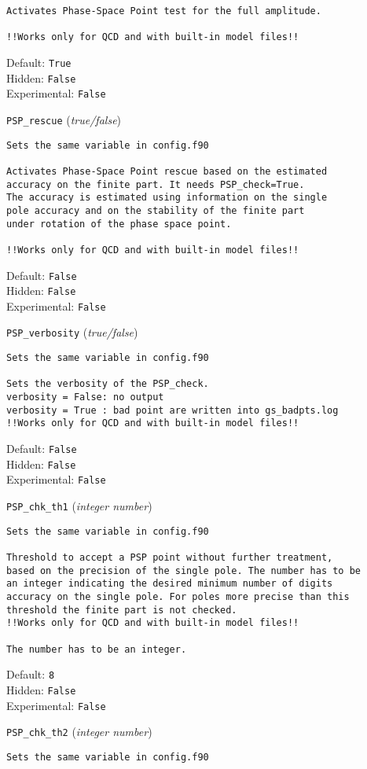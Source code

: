 \begin{basedescript}{\desclabelstyle{\pushlabel}}
\begin{verbatim}
Activates Phase-Space Point test for the full amplitude.

!!Works only for QCD and with built-in model files!!
\end{verbatim}
Default: \verb|True|
\\Hidden: \verb|False|
\\Experimental: \verb|False|
\\\item[\colorbox{gray!30}{\texttt{PSP\_rescue}}] (\textit{true/false})
\begin{verbatim}
Sets the same variable in config.f90

Activates Phase-Space Point rescue based on the estimated
accuracy on the finite part. It needs PSP_check=True.
The accuracy is estimated using information on the single
pole accuracy and on the stability of the finite part
under rotation of the phase space point.

!!Works only for QCD and with built-in model files!!
\end{verbatim}
Default: \verb|False|
\\Hidden: \verb|False|
\\Experimental: \verb|False|
\\\item[\colorbox{gray!30}{\texttt{PSP\_verbosity}}] (\textit{true/false})
\begin{verbatim}
Sets the same variable in config.f90

Sets the verbosity of the PSP_check.
verbosity = False: no output
verbosity = True : bad point are written into gs_badpts.log
!!Works only for QCD and with built-in model files!!
\end{verbatim}
Default: \verb|False|
\\Hidden: \verb|False|
\\Experimental: \verb|False|
\\\item[\colorbox{gray!30}{\texttt{PSP\_chk\_th1}}] (\textit{integer number})
\begin{verbatim}
Sets the same variable in config.f90

Threshold to accept a PSP point without further treatment,
based on the precision of the single pole. The number has to be
an integer indicating the desired minimum number of digits
accuracy on the single pole. For poles more precise than this
threshold the finite part is not checked.
!!Works only for QCD and with built-in model files!!

The number has to be an integer.
\end{verbatim}
Default: \verb|8|
\\Hidden: \verb|False|
\\Experimental: \verb|False|
\\\item[\colorbox{gray!30}{\texttt{PSP\_chk\_th2}}] (\textit{integer number})
\begin{verbatim}
Sets the same variable in config.f90


\end{verbatim}
\end{basedescript}
